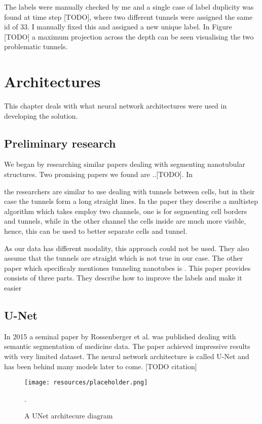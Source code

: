 \documentclass[
  digital,     %
  oneside,     %
  nosansbold,  %
  nocolorbold, %
  lof,         %
  lot,         %
]{fithesis4}
\begin{document}
The labels were manually checked by me and a single case of label duplicity was
found at time step [TODO], where two different tunnels were assigned the same id
of 33. I manually fixed this and assigned a new unique label. In Figure [TODO] a
maximum projection across the depth can be seen visualising the two problematic
tunnels.

\chapter{Architectures}
This chapter deals with what neural network architectures were used in
developing the solution.

\section{Preliminary research}
We began by researching similar papers dealing with segmenting nanotubular
structures. Two promising papers we found are ..[TODO]. In

\parencite{Hodneland2006Automated} the researchers are similar to use dealing
with tunnels between cells, but in their case the tunnels form a long straight
lines. In the paper they describe a multistep algorithm which takes employ two
channels, one is for segmenting cell borders and tunnels, while in the other
channel the cells inside are much more visible, hence, this can be used to
better separate cells and tunnel.

As our data has different modality, this approach could not be used. They also
assume that the tunnels are straight which is not true in our case.
The other paper which specificaly mentiones tunneling nanotubes is
\parencite{Ceran2022TNTdetect}. This paper provides consists of three parts.
They describe how to improve the labels and make it easier 

\section{U-Net}

In 2015 a seminal paper by Rossenberger et al. \parencite{Ronneberger2015} was
published dealing with semantic segmentation of medicine data. The paper
achieved impressive results with very limited dataset. The neural network
architecture is called U-Net and has been behind many models later to come.
[TODO citation]

\begin{figure}
    \begin{center}
        \texttt{[image: resources/placeholder.png]}
    \end{center}
    \caption{A UNet architecure diagram}.
    \label{fig:unetdiagram}
\end{figure}
\end{document}
